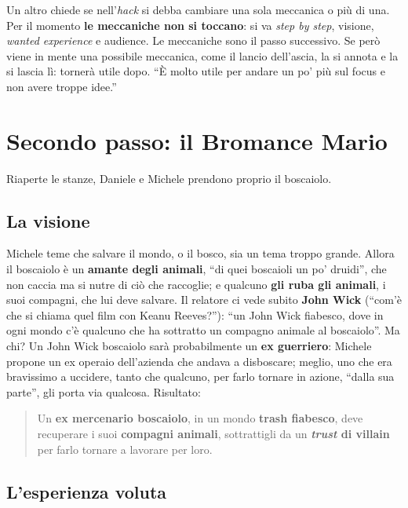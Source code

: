 Un altro chiede se nell'\emph{hack} si debba cambiare una sola meccanica o più di
una. Per il momento \textbf{le meccaniche non si toccano}: si va \emph{step by
step}, visione, \emph{wanted experience} e audience. Le meccaniche sono il passo
successivo. Se però viene in mente una possibile meccanica, come il lancio
dell'ascia, la si annota e la si lascia lì: tornerà utile dopo. ``È molto utile
per andare un po' più sul focus e non avere troppe idee.''

\section{Secondo passo: il Bromance Mario}
\label{z7:sec:bromance-visione}

Riaperte le stanze, Daniele e Michele prendono proprio il boscaiolo.

\subsection{La visione}

Michele teme che salvare il mondo, o il bosco, sia un tema troppo grande. Allora
il boscaiolo è un \textbf{amante degli animali}, ``di quei boscaioli un po'
druidi'', che non caccia ma si nutre di ciò che raccoglie; e qualcuno \textbf{gli
ruba gli animali}, i suoi compagni, che lui deve salvare. Il relatore ci vede
subito \textbf{John Wick} (``com'è che si chiama quel film con Keanu Reeves?''):
``un John Wick fiabesco, dove in ogni mondo c'è qualcuno che ha sottratto un
compagno animale al boscaiolo''. Ma chi? Un John Wick boscaiolo sarà
probabilmente un \textbf{ex guerriero}: Michele propone un ex operaio
dell'azienda che andava a disboscare; meglio, uno che era bravissimo a uccidere,
tanto che qualcuno, per farlo tornare in azione, ``dalla sua parte'', gli porta
via qualcosa. Risultato:
\begin{quote}
  Un \textbf{ex mercenario boscaiolo}, in un mondo \textbf{trash fiabesco}, deve
  recuperare i suoi \textbf{compagni animali}, sottrattigli da un
  \textbf{\emph{trust} di villain} per farlo tornare a lavorare per loro.
\end{quote}

\subsection{L'esperienza voluta}

